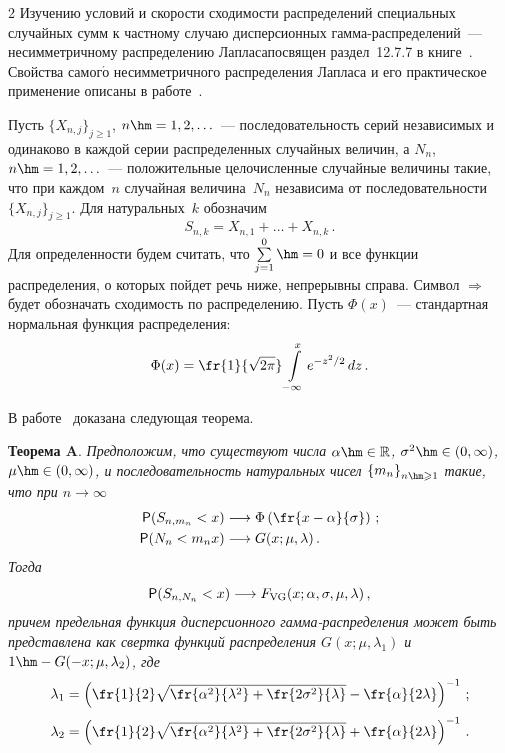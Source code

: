 \begin{multicols}{2}
Изучению условий и скорости сходимости распределений специальных
случайных сумм к част\-ному случаю дисперсионных гам\-ма-рас\-пре\-де\-ле\-ний~--- 
несимметричному распределению Лапласа\linebreak посвя\-щен раздел~12.7.7 в
книге~\cite{KorolevBeningShorgin2011}. Свойства самог$\acute{\mbox{о}}$
несимметричного распределения Лапласа и его практическое применение
описаны в работе~\cite{KotzKozubowskiPodgorski2001}.

Пусть $\{X_{n,j}\}_{j\geqslant1}$, $n\hm=1,2,\ldots$~--- последовательность
серий независимых и одинаково в каждой серии распределенных
случайных величин, а $N_n$, $n\hm=1,2,\ldots$~--- положительные
целочисленные случайные величины такие, что при каждом~$n$ случайная
величина~$N_n$ независима от по\-сле\-до\-ва\-тель\-ности
$\{X_{n,j}\}_{j\geqslant1}$. Для натуральных~$k$ обозначим
$$
S_{n,k}=X_{n,1}+\ldots+X_{n,k}\,.
$$
Для определенности будем считать, что $\sum\limits_{j=1}^0\hm=0$ и все функции
распределения, о которых пойдет речь ниже, непрерывны справа. Символ
$\Longrightarrow$ будет обозначать сходимость по распределению.
Пусть $\Phi(x)$~--- стандартная нормальная функция рас\-пре\-де\-ления:
$$
\Phi(x)=\fr{1}{\sqrt{2\pi}}\int\limits_{-\infty}^xe^{-z^2/2}\,dz\,.
$$


В работе~\cite{KorolevSokolov2012} доказана следующая теорема.

\smallskip

\noindent
\textbf{Теорема A}. {\it Предположим, что существуют числа $\alpha \hm \in
\mathbb{R}$, $\sigma ^{2} \hm\in (0, \infty )$, $\mu\hm \in(0,\infty)$, и
по\-сле\-до\-ва\-тель\-ность натуральных чисел $\left\{m_n \right\}_{n
\hm\geqslant 1}$ такие, что при $n\to\infty$}
\begin{align}
{\sf P}(S_{n, m_n}<x) &\longrightarrow
\Phi\left(\fr{x-\alpha}{\sigma}\right)\,;\label{e3-ben}
\\
{\sf P}(N_{n}<m_nx) &\longrightarrow G(x;\mu,\lambda)\,.
\label{e4-ben}
\end{align}
\textit{Тогда
$$
{\sf P}(S_{n, N_{n}}<x)\longrightarrow
F_{\mathrm{VG}}(x;\alpha,\sigma,\mu,\lambda)\,,
$$
причем предельная функция дисперсионного гамма-распределения может
быть представлена как свертка функций распределения
$G(x;\mu,\lambda_1)$ и $1\hm-G(-x;\mu,\lambda_2)$, где}
$$
\lambda_1 = \left(\fr{1}{2}\sqrt{\fr{\alpha
^{2}}{\lambda^{2}}+\fr{2\sigma^{2}}{\lambda}} -\fr{ \alpha}
{2\lambda}\right)^{-1}\,;
$$
$$
\lambda_2 =
\left(\fr{1}{2}\sqrt{\fr{\alpha^{2}}{\lambda^{2}}+\fr{2\sigma^{2}}{\lambda}} +\fr{ \alpha}
{2\lambda}\right)^{-1}\,.
$$



\end{multicols}
